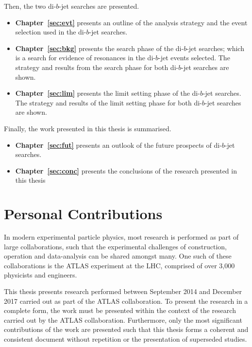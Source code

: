 \noindent
Then, the two di-$b$-jet searches are presented. %
\vspace{-0.5em}
\begin{itemize}[leftmargin=*]
\item\textbf{Chapter~\ref{sec:evt}} presents an outline of the analysis strategy and the event selection used in the \mbox{di-$b$-jet} searches.%
\item\textbf{Chapter~\ref{sec:bkg}} presents the search phase of the di-$b$-jet searches;
  which is a search for evidence of resonances in the di-$b$-jet events selected.
  The strategy and results from the search phase for both di-$b$-jet searches are shown.%
\item\textbf{Chapter~\ref{sec:lim}} presents the limit setting phase of the di-$b$-jet searches.
  The strategy and results of the limit setting phase for both di-$b$-jet searches are shown.%
\end{itemize}

\noindent
Finally, the work presented in this thesis is summarised.
\vspace{-0.5em}
  \begin{itemize}[leftmargin=*]
\item\textbf{Chapter~\ref{sec:fut}} presents an outlook of the future prospects of di-$b$-jet searches.%
\item\textbf{Chapter~\ref{sec:conc}} presents the conclusions of the research presented in this thesis%
\end{itemize}
\clearpage
\section{Personal Contributions}

In modern experimental particle physics, most research is performed as part of large collaborations,
such that the experimental challenges of construction, operation and data-analysis can be shared amongst many.
One such of these collaborations is the ATLAS experiment at the LHC, comprised of over 3,000 physicists and engineers.

This thesis presents research performed between September 2014 and December 2017 carried out as part of the ATLAS collaboration.
To present the research in a complete form, the work must be presented within the context of the research carried out by the ATLAS collaboration.
Furthermore, only the most significant contributions of the work are presented
such that this thesis forms a coherent and consistent document without repetition or the presentation of superseded studies.


